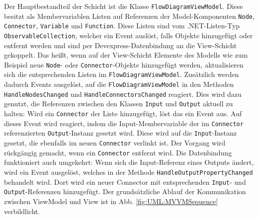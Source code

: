 Der Hauptbestandteil der Schicht ist die Klasse \texttt{FlowDiagramViewModel}. Diese besitzt als Membervariablen Listen auf Referenzen der Model-Komponenten \texttt{Node}, \texttt{Connector}, \texttt{Variable} und \texttt{Function}. Diese Listen sind vom .NET-Listen-Typ \texttt{ObservableCollection}, welcher ein Event auslöst, falls Objekte hinzugefügt oder entfernt werden und sind per Devexpress-Datenbindung an die View-Schicht gekoppelt. Das heißt, wenn auf der View-Schicht Elemente des Modells wie zum Beispiel neue \texttt{Node}- oder \texttt{Connector}-Objekte hinzugefügt werden, aktualisieren sich die entsprechenden Listen im \texttt{FlowDiagramViewModel}. Zusätzlich werden dadurch Events ausgelöst, auf die \texttt{FlowDiagramViewModel} in den Methoden \texttt{HandleNodesChanged} und \texttt{HandleConnectorsChanged} reagiert. Dies wird dazu genutzt, die Referenzen zwischen den Klassen \texttt{Input} und \texttt{Output} aktuell zu halten: Wird ein \texttt{Connector} der Liste hinzugefügt, löst das ein Event aus. Auf dieses Event wird reagiert, indem die Input-Membervariable der im \texttt{Connector} referenzierten \texttt{Output}-Instanz gesetzt wird. Diese wird auf die \texttt{Input}-Instanz gesetzt, die ebenfalls im neuen \texttt{Connector} verlinkt ist. Der Vorgang wird rückgängig gemacht, wenn ein \texttt{Connector} entfernt wird. Die Datenbindung funktioniert auch umgekehrt: Wenn sich die Input-Referenz eines Outputs ändert, wird ein Event ausgelöst, welches in der Methode \texttt{HandleOutputPropertyChanged} behandelt wird. Dort wird ein neuer Connector mit entsprechenden \texttt{Input}- und \texttt{Output}-Referenzen hinzugefügt. Der grundsätzliche Ablauf der Kommunikation zwischen ViewModel und View ist in Abb. \ref{fig:UML:MVVMSequence} verbildlicht.
